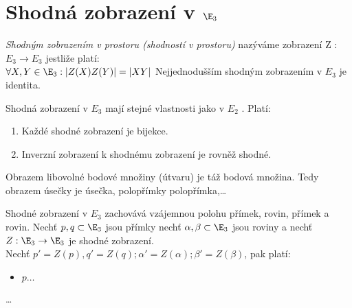 
\let\braceru=\relax \let\bracelu=\relax 
\def\o#1{\setbox0=
	\hbox{$\kern2pt\overbrace{\kern-2pt#1\kern-2pt}\kern2pt$}\ht0=2.1ex\box0}
\def\to#1{\hbox{#1\rlap{\t{}}}}
\def\rad{\rm{rad}}
\def\f{\frac}
\section{Shodná zobrazení v $\E_3$}

\Def \emph{Shodným zobrazením v prostoru (shodností v prostoru)} nazýváme zobrazení Z : $E_3 \rightarrow E_3$
jestliže platí:\\
$\forall X,Y \in \E_3 : |Z(X)Z(Y)|=|XY|$
\Pozenum Nejjednodušším shodným zobrazením v $E_3$ je identita.
\item  Shodná zobrazení v $E_3$ mají stejné vlastnosti jako v $E_2$ .
\End
\V 
Platí:
\begin{enumerate}
	\item Každé shodné zobrazení je bijekce.
	\item Inverzní zobrazení k shodnému zobrazení je rovněž shodné.
\end{enumerate}
\Pozenum
Obrazem libovolné bodové množiny (útvaru) je táž bodová množina. Tedy obrazem
úsečky je úsečka, polopřímky polopřímka,\dots
\item Shodné zobrazení v $E_3$ zachovává vzájemnou polohu přímek, rovin, přímek a rovin.
\End
\V Nechť $p , q \subset \E_3$ jsou přímky nechť $\alpha,\beta \subset \E_3$ jsou roviny a nechť $Z : \E_3 \rightarrow \E_3$ je
shodné zobrazení.\\
Nechť $p'=Z(p), q'=Z(q); \alpha'=Z(\alpha); \beta'=Z(\beta)$, pak platí:
\begin{itemize}
	\item $p\dots$
\end{itemize}
{\Huge\dots}

\EndDoc


